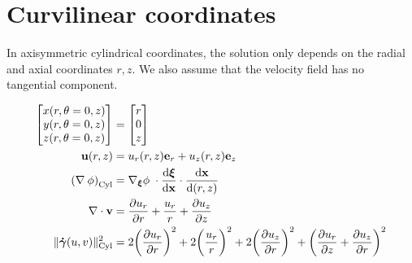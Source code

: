 \documentclass[11 pt]{report}
\begin{document}




\appendix
\chapter{Curvilinear coordinates}
\label{appendix:curvilinear}

In axisymmetric cylindrical coordinates, the solution only depends on the radial and axial coordinates $r, z$. We also assume that the velocity field has no tangential component.

\begin{align}
    \begin{bmatrix}
        x(r, \theta=0, z) \\
        y(r, \theta=0, z) \\
        z(r, \theta=0, z) \\
    \end{bmatrix} &=
    \begin{bmatrix}
        r \\
        0 \\
        z
    \end{bmatrix}\\
    \mathbf{u}(r, z) &= u_r(r, z) \mathbf{e}_r + u_z(r, z) \mathbf{e}_z\\
    \left(\nabla \: \phi\right)_{\text{Cyl}} &= \nabla_{\boldsymbol\xi} \phi \; \cdot \dv{\boldsymbol \xi}{\mathbf{x}} \cdot \dv{\mathbf{x}}{(r, z)}\\
    \nabla \cdot \mathbf{v} &= \pdv{u_r}{r} + \frac{u_r}{r} + \pdv{u_z}{z}\\
    \|\boldsymbol{\dot \gamma}(u, v)\|_{\text{Cyl}}^2 &= 2 \bigg(\pdv{u_r}{r}\bigg)^2 + 2\bigg(\frac{u_r}{r}\bigg)^2 + 2\bigg(\pdv{u_z}{r}\bigg)^2 + \bigg(\pdv{u_r}{z} + \pdv{u_z}{r}\bigg)^2
\end{align}
\end{document}
